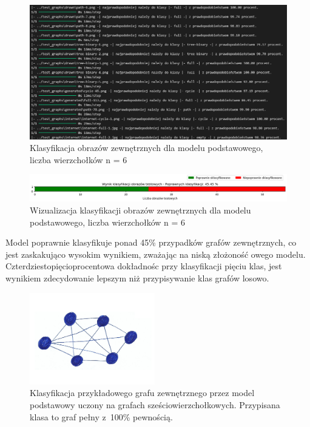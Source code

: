 \begin{figure}[ht]
	\centering
	\includegraphics[width=15.5cm]{resources/tests/images/v3/base6_txt.png}
	\caption{Klasyfikacja obrazów zewnętrznych dla modelu podstawowego, liczba wierzchołków n = 6}
	\label{Fig:tests-base-3b}
\end{figure}
\FloatBarrier

\begin{figure}[ht]
	\centering
	\includegraphics[width=15.5cm]{resources/tests/images/v3/base6_bar.png}
	\caption{Wizualizacja klasyfikacji obrazów zewnętrznych dla modelu podstawowego, liczba wierzchołków n = 6}
	\label{Fig:tests-base-3c}
\end{figure}
\FloatBarrier

Model poprawnie klasyfikuje ponad 45\% przypadków grafów zewnętrznych,
co jest zaskakująco wysokim wynikiem, zważając na niską złożoność owego modelu.
Czterdziestopięcioprocentowa dokładnośc przy klasyfikacji pięciu klas,
jest wynikiem zdecydowanie lepszym niż przypisywanie klas grafów losowo.

\begin{figure}[ht]
	\centering
	\includegraphics[height=4cm]{../graph_classification/test_graphs/drawn/full-9.png}
	\caption{Klasyfikacja przykładowego grafu zewnętrznego przez model podstawowy uczony na grafach sześciowierzchołkowych.
		Przypisana klasa to graf pełny z~100\% pewnością.}
	\label{Fig:tests-base-3d}
\end{figure}
\FloatBarrier

